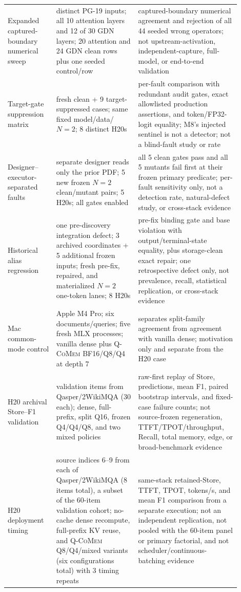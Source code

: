 \documentclass{article}
\newcommand{\qcomem}{\textsc{Q-CoMem}}
\begin{document}
\begin{longtable}{@{}>{\raggedright\arraybackslash}p{0.19\linewidth}>{\raggedright\arraybackslash}p{0.32\linewidth}>{\raggedright\arraybackslash}p{0.39\linewidth}@{}}
  Expanded captured-boundary numerical sweep & 2 distinct PG-19 inputs; all 10 attention layers and 12 of 30 GDN layers; 20 attention and 24 GDN clean rows plus one seeded control/row & captured-boundary numerical agreement and rejection of all 44 seeded wrong operators; not upstream-activation, independent-capture, full-model, or end-to-end validation \\
  Target-gate suppression matrix & 9 fresh clean + 9 target-suppressed cases; same fixed model/data/$N=2$; 8 distinct H20s & per-fault comparison with redundant audit gates, exact allowlisted production assertions, and token/FP32-logit equality; M8's injected sentinel is not a detector; not a blind-fault study or rate \\
  Designer--executor-separated faults & separate designer reads only the prior PDF; 5 new frozen $N=2$ clean/mutant pairs; 5 H20s; all gates enabled & all 5 clean gates pass and all 5 mutants fail first at their frozen primary predicate; per-fault sensitivity only, not a detection rate, natural-defect study, or cross-stack evidence \\
  Historical alias regression & one pre-discovery integration defect; 3 archived coordinates + 5 additional frozen inputs; fresh pre-fix, repaired, and materialized $N=2$ one-token lanes; 8 H20s & pre-fix binding gate and base violation with output/terminal-state equality, plus storage-clean exact repair; one retrospective defect only, not prevalence, recall, statistical replication, or cross-stack evidence \\
  Mac common-mode control & Apple M4 Pro; six documents/queries; five fresh MLX processes; vanilla dense plus \qcomem{} BF16/Q8/Q4 at depth 7 & separates split-family agreement from agreement with vanilla dense; motivation only and separate from the H20 case \\
  H20 archival Store--F1 validation & 60 validation items from Qasper/2WikiMQA (30 each); dense, full-prefix, split Q16, frozen Q4/Q4/Q8, and two mixed policies & raw-first replay of Store, predictions, mean F1, paired bootstrap intervals, and fixed-case failure counts; not source-frozen regeneration, TTFT/TPOT/throughput, Recall, total memory, edge, or broad-benchmark evidence \\
  H20 deployment timing & source indices 6--9 from each of Qasper/2WikiMQA (8 items total), a subset of the 60-item validation cohort; no-cache dense recompute, full-prefix KV reuse, and \qcomem{} Q8/Q4/mixed variants (six configurations total) with 3 timing repeats & same-stack retained-Store, TTFT, TPOT, tokens/s, and mean F1 comparison from a separate execution; not an independent replication, not pooled with the 60-item panel or primary factorial, and not scheduler/continuous-batching evidence \\

\end{longtable}
\end{document}
